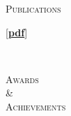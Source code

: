 \documentclass[10pt]{article}
\begin{document}
\begin{minipage}{0.15\linewidth}
	\textsc{Publications}
\end{minipage}\hfill
\begin{minipage}[t]{0.75\linewidth}
	\vspace{-1em}
	\begin{enumerate}[label={[J\arabic*]},leftmargin=-3em]
		\item {}\hfill[\href{http://pamies.cee.illinois.edu/Publications_files/JMPS2019.pdf}{\bf\textsf{pdf}}]
	\end{enumerate}
\end{minipage}\\[3mm]
\begin{minipage}[t]{0.15\linewidth}
	\textsc{Awards}\\ \& \\ \textsc{Achievements}
\end{minipage}\hfill
\end{document}
